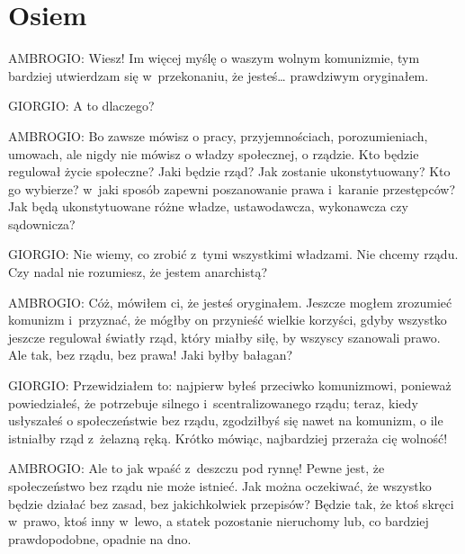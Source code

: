 \documentclass[oneside,polish,11pt,sfheadings]{mwbk}
\begin{document}
\chapter*{Osiem}



 
\noindent AMBROGIO: Wiesz! Im więcej myślę o waszym wolnym komunizmie, tym bardziej utwierdzam się w~przekonaniu, że jesteś\ldots
prawdziwym oryginałem. 




 
\noindent GIORGIO: A to dlaczego? 




 
\noindent AMBROGIO: Bo zawsze mówisz o pracy, przyjemnościach, porozumieniach, umowach, ale nigdy nie mówisz o władzy społecznej,
o rządzie. Kto będzie regulował życie społeczne? Jaki będzie rząd? Jak zostanie ukonstytuowany? Kto go wybierze? w~jaki
sposób zapewni poszanowanie prawa i~karanie przestępców? Jak będą ukonstytuowane różne władze, ustawodawcza, wykonawcza
czy sądownicza? 




 
\noindent GIORGIO: Nie wiemy, co zrobić z~tymi wszystkimi władzami. Nie chcemy rządu. Czy nadal nie rozumiesz, że jestem
anarchistą? 




 
\noindent AMBROGIO: Cóż, mówiłem ci, że jesteś oryginałem. Jeszcze mogłem zrozumieć komunizm i~przyznać, że mógłby on przynieść
wielkie korzyści, gdyby wszystko jeszcze regulował światły rząd, który miałby siłę, by wszyscy szanowali prawo. Ale
tak, bez rządu, bez prawa! Jaki byłby bałagan? 




 
\noindent GIORGIO: Przewidziałem to: najpierw byłeś przeciwko komunizmowi, ponieważ powiedziałeś, że potrzebuje silnego i~scentralizowanego rządu; teraz, kiedy usłyszałeś o społeczeństwie bez rządu, zgodziłbyś się nawet na komunizm, o ile
istniałby rząd z~żelazną ręką. Krótko mówiąc, najbardziej przeraża cię wolność! 




 
\noindent AMBROGIO: Ale to jak wpaść z~deszczu pod rynnę! Pewne jest, że społeczeństwo bez rządu nie może istnieć. Jak można
oczekiwać, że wszystko będzie działać bez zasad, bez jakichkolwiek przepisów? Będzie tak, że ktoś skręci w~prawo, ktoś
inny w~lewo, a statek pozostanie nieruchomy lub, co bardziej prawdopodobne, opadnie na dno. 
\end{document}
